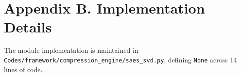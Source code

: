 \section*{Appendix B. Implementation Details}
The module implementation is maintained in \texttt{Codes/framework/compression\_engine/saes\_svd.py}, defining \texttt{None} across 14 lines of code.
